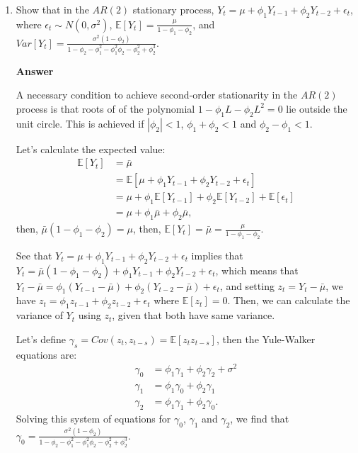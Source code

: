 \begin{enumerate}[leftmargin=*]
	\item Show that in the $AR(2)$ stationary process, $Y_t=\mu+\phi_1Y_{t-1}+\phi_2Y_{t-2}+\epsilon_t$, where $\epsilon_t\sim N(0,\sigma^2)$, $\mathbb{E}[Y_t]=\frac{\mu}{1-\phi_1-\phi_2}$, and $Var[Y_t]=\frac{\sigma^2(1-\phi_2)}{1-\phi_2-\phi_1^2-\phi_1^2\phi_2-\phi_2^2+\phi_2^3}$.

\textbf{Answer}

A necessary condition to achieve second-order stationarity in the $AR(2)$ process is that roots of of the polynomial $1-\phi_1L-\phi_2L^2=0$ lie outside the unit circle. This is achieved if $|\phi_2|<1$, $\phi_1+\phi_2<1$ and $\phi_2-\phi_1<1$.

Let's calculate the expected value:
\begin{align*}
	\mathbb{E}[Y_t]&=\bar{\mu}\\
	&=\mathbb{E}[\mu+\phi_1Y_{t-1}+\phi_2Y_{t-2}+\epsilon_t]\\
	&=\mu+\phi_1\mathbb{E}[Y_{t-1}]+\phi_2\mathbb{E}[Y_{t-2}]+\mathbb{E}[\epsilon_{t}]\\
	&=\mu+\phi_1\bar{\mu}+\phi_2\bar{\mu},
\end{align*}
then, $\bar{\mu}(1-\phi_1-\phi_2)=\mu$, then, $\mathbb{E}[Y_t]=\bar{\mu}=\frac{\mu}{1-\phi_1-\phi_2}$.

See that $Y_t=\mu+\phi_1Y_{t-1}+\phi_2Y_{t-2}+\epsilon_t$ implies that $Y_t=\bar{\mu}(1-\phi_1-\phi_2)+\phi_1Y_{t-1}+\phi_2Y_{t-2}+\epsilon_t$, which means that $Y_t-\bar{\mu}=\phi_1(Y_{t-1}-\bar{\mu})+\phi_2(Y_{t-2}-\bar{\mu})+\epsilon_t$, and setting $z_t=Y_t-\bar{\mu}$, we have $z_t=\phi_1z_{t-1}+\phi_2z_{t-2}+\epsilon_t$ where $\mathbb{E}[z_t]=0$. Then, we can calculate the variance of $Y_t$ using $z_t$, given that both have same variance.  

Let's define $\gamma_s=Cov(z_t,z_{t-s})=\mathbb{E}[z_tz_{t-s}]$, then the Yule-Walker equations are:
\begin{align*}
	\gamma_0&=\phi_1\gamma_1+\phi_2\gamma_2+\sigma^2\\
	\gamma_1&=\phi_1\gamma_0+\phi_2\gamma_1\\
	\gamma_2&=\phi_1\gamma_1+\phi_2\gamma_0.
\end{align*}  
Solving this system of equations for $\gamma_0$, $\gamma_1$ and $\gamma_2$, we find that $\gamma_0=\frac{\sigma^2(1-\phi_2)}{1-\phi_2-\phi_1^2-\phi_1^2\phi_2-\phi_2^2+\phi_2^3}$. 

\end{enumerate}
